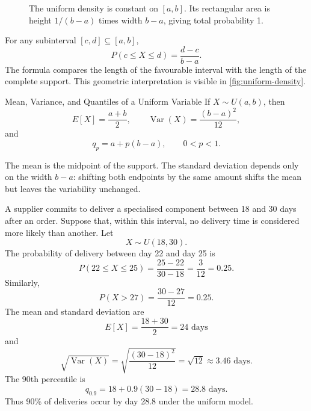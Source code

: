 \begin{figure}[htbp]
\centering
{}
\caption{The uniform density is constant on $[a,b]$. Its rectangular area is height $1/(b-a)$ times width $b-a$, giving total probability 1.}
\label{fig:uniform-density}
\end{figure}

For any subinterval $[c,d]\subseteq[a,b]$,
\[
    P(c\leq X\leq d)=\frac{d-c}{b-a}.
\]
The formula compares the length of the favourable interval with the length of the complete support. This geometric interpretation is visible in \autoref{fig:uniform-density}.

\begin{theorem}{Mean, Variance, and Quantiles of a Uniform Variable}
If $X\sim U(a,b)$, then
\[
    E[X]=\frac{a+b}{2},
    \qquad
    \operatorname{Var}(X)=\frac{(b-a)^2}{12},
\]
and
\[
    q_p=a+p(b-a), \qquad 0<p<1.
\]
\end{theorem}

The mean is the midpoint of the support. The standard deviation depends only on the width $b-a$: shifting both endpoints by the same amount shifts the mean but leaves the variability unchanged.

\begin{example}\par
A supplier commits to deliver a specialised component between 18 and 30 days after an order. Suppose that, within this interval, no delivery time is considered more likely than another. Let
\[
    X\sim U(18,30).
\]
The probability of delivery between day 22 and day 25 is
\[
    P(22\leq X\leq25)=\frac{25-22}{30-18}=\frac{3}{12}=0.25.
\]
Similarly,
\[
    P(X>27)=\frac{30-27}{12}=0.25.
\]
The mean and standard deviation are
\[
    E[X]=\frac{18+30}{2}=24\text{ days}
\]
and
\[
    \sqrt{\operatorname{Var}(X)}
      =\sqrt{\frac{(30-18)^2}{12}}
      =\sqrt{12}
      \approx3.46\text{ days}.
\]
The 90th percentile is
\[
    q_{0.9}=18+0.9(30-18)=28.8\text{ days}.
\]
Thus 90\% of deliveries occur by day 28.8 under the uniform model.
\end{example}

